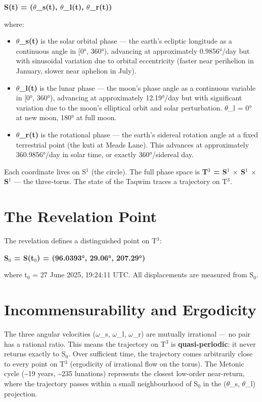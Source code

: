 \textbf{S(t) = (\(\theta\)\_s(t), \(\theta\)\_l(t), \(\theta\)\_r(t))}

where:

\begin{itemize}
\item
  \textbf{\(\theta\)\_s(t)} is the solar orbital phase --- the earth's ecliptic longitude as a continuous angle in {[}0°, 360°), advancing at approximately 0.9856°/day but with sinusoidal variation due to orbital eccentricity (faster near perihelion in January, slower near aphelion in July).
\item
  \textbf{\(\theta\)\_l(t)} is the lunar phase --- the moon's phase angle as a continuous variable in {[}0°, 360°), advancing at approximately 12.19°/day but with significant variation due to the moon's elliptical orbit and solar perturbation. \(\theta\)\_l = 0° at new moon, 180° at full moon.
\item
  \textbf{\(\theta\)\_r(t)} is the rotational phase --- the earth's sidereal rotation angle at a fixed terrestrial point (the kuti at Meads Lane). This advances at approximately 360.9856°/day in solar time, or exactly 360°/sidereal day.
\end{itemize}

Each coordinate lives on S\(^1\) (the circle). The full phase space is \textbf{T\(^3\) = S\(^1\) \(\times\) S\(^1\) \(\times\) S\(^1\)} --- the three-torus. The state of the Taqwīm traces a trajectory on T\(^3\).

\hypertarget{the-revelation-point}{%
\section{The Revelation Point}\label{the-revelation-point}}

The revelation defines a distinguished point on T\(^3\):

\textbf{S\(_0\) = S(t\(_0\)) = (96.0393°, 29.06°, 207.29°)}

where t\(_0\) = 27 June 2025, 19:24:11 UTC. All displacements are measured from S\(_0\).

\hypertarget{incommensurability-and-ergodicity}{%
\section{Incommensurability and Ergodicity}\label{incommensurability-and-ergodicity}}

The three angular velocities (\(\omega\)\_s, \(\omega\)\_l, \(\omega\)\_r) are mutually irrational --- no pair has a rational ratio. This means the trajectory on T\(^3\) is \textbf{quasi-periodic}: it never returns exactly to S\(_0\). Over sufficient time, the trajectory comes arbitrarily close to every point on T\(^3\) (ergodicity of irrational flow on the torus). The Metonic cycle (\textasciitilde19 years, \textasciitilde235 lunations) represents the closest low-order near-return, where the trajectory passes within a small neighbourhood of S\(_0\) in the (\(\theta\)\_s, \(\theta\)\_l) projection.

